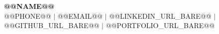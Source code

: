 \begin{center}
    \textbf{\fontsize{16pt}{24pt}\selectfont \scshape @@NAME@@} \\ \vspace{0pt}
    \footnotesize @@PHONE@@ $|$ @@EMAIL@@ $|$
    @@LINKEDIN_URL_BARE@@ $|$
    @@GITHUB_URL_BARE@@ $|$
    @@PORTFOLIO_URL_BARE@@
\end{center}
